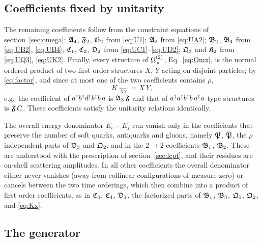 \subsection{Coefficients fixed by unitarity}

The remaining coefficients follow from the constraint equations of section~\ref{sec:omega}:
$\mathfrak{A}_{4}$, $\mathfrak{F}_{2}$, $\mathfrak{G}_{2}$ from \eqref{eq:U1}; $\mathfrak{A}_{2}$ from \eqref{eq:UA2}; $\mathfrak{B}_{2}$, $\mathfrak{B}_{4}$
from \eqref{eq:UB2}, \eqref{eq:UB4}; $\mathfrak{C}_{1}$, $\mathfrak{C}_{2}$, $\mathfrak{D}_{2}$ from \eqref{eq:UC1}--\eqref{eq:UD2};
$\mathfrak{Q}_{3}$ and $\mathfrak{K}_{2}$ from \eqref{eq:UQ3}, \eqref{eq:UK2}. Finally, every structure of
$\Omega^{(2)}_{\times}$, Eq.~\eqref{eq:Omx}, is the normal ordered product of two first order structures
$X$, $Y$ acting on disjoint particles; by \eqref{eq:factor}, and since at most one of the two
coefficients contains $\rho$,
\begin{equation}
K_{:\hat X\hat Y:}=X\,Y,
\label{eq:Kx}
\end{equation}
e.g.\ the coefficient of $a^{\dagger}b^{\dagger}d^{\dagger}b^{\dagger}b\,a$ is $\mathfrak{A}_{3}\,\mathfrak{F}$ and that of
$a^{\dagger}a^{\dagger}b^{\dagger}b\,a^{\dagger}a$-type structures is $\mathfrak{F}\,C$. These coefficients satisfy the unitarity
relations identically.

The overall energy denominator $E_{i}-E_{f}$ can vanish only in the coefficients that preserve
the number of soft quarks, antiquarks and gluons, namely $\mathfrak{P}$, $\bar{\mathfrak{P}}$, the $\rho$ independent
parts of $\mathfrak{D}_{3}$ and $\mathfrak{Q}_{2}$, and in the $2\to2$ coefficients $\mathfrak{B}_{1}$, $\mathfrak{B}_{2}$. These are
understood with the prescription of section~\ref{sec:lcpt}, and their residues are on-shell
scattering amplitudes. In all other coefficients the overall denominator either never vanishes
(away from collinear configurations of measure zero) or cancels between the two time orderings,
which then combine into a product of first order coefficients, as in $\mathfrak{C}_{3}$, $\mathfrak{C}_{4}$,
$\mathfrak{D}_{1}$, the factorized parts of $\mathfrak{B}_{1}$, $\mathfrak{B}_{3}$, $\mathfrak{Q}_{1}$, $\mathfrak{Q}_{2}$, and \eqref{eq:Kx}.

\subsection{The generator}
\label{sec:generator}


